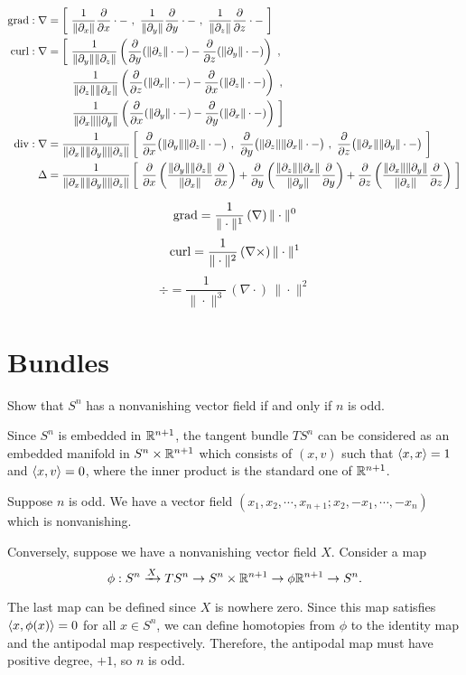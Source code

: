 \documentclass[a4paper]{article}
\begin{document}
\begin{align*}
\grad:\nabla&=\left[\ \frac1{\|\pd_x\|}\pd{x}\cdot-\ ,\ \frac1{\|\pd_y\|}\pd{y}\cdot-\ ,\ \frac1{\|\pd_z\|}\pd{z}\cdot-\ \right]\\
\curl:\nabla&=\left[\ \frac1{\|\pd_y\|\|\pd_z\|}\left(\pd{y}(\|\pd_z\|\cdot-)-\pd{z}(\|\pd_y\|\cdot-)\right)\ ,\right.\\
&\qquad\left.\frac1{\|\pd_z\|\|\pd_x\|}\left(\pd{z}(\|\pd_x\|\cdot-)-\pd{x}(\|\pd_z\|\cdot-)\right)\ ,\right.\\
&\qquad\left.\frac1{\|\pd_x\|\|\pd_y\|}\left(\pd{x}(\|\pd_y\|\cdot-)-\pd{y}(\|\pd_x\|\cdot-)\right)\ \right]\\
\div:\nabla&=\frac1{\|\pd_x\|\|\pd_y\|\|\pd_z\|}\left[\ \pd{x}\bigl(\|\pd_y\|\|\pd_z\|\cdot-\bigr)\ ,\ \pd{y}\bigl(\|\pd_z\|\|\pd_x\|\cdot-\bigr)\ ,\ \pd{z}\bigl(\|\pd_x\|\|\pd_y\|\cdot-\bigr)\ \right]\\
\Delta&=\frac1{\|\pd_x\|\|\pd_y\|\|\pd_z\|}\left[\ \pd{x}\left(\frac{\|\pd_y\|\|\pd_z\|}{\|\pd_x\|}\pd{x}\right)+\pd{y}\left(\frac{\|\pd_z\|\|\pd_x\|}{\|\pd_y\|}\pd{y}\right)+\pd{z}\left(\frac{\|\pd_x\|\|\pd_y\|}{\|\pd_z\|}\pd{z}\right)\ \right]
\end{align*}

\bigskip

\[\operatorname{grad}=\frac1{\|\cdot\|^1}\,(\nabla)\,\|\cdot\|^0\]
\[\operatorname{curl}=\frac1{\|\cdot\|^2}\,(\nabla\times)\,\|\cdot\|^1\]
\[\div=\frac1{\|\cdot\|^3}\,(\nabla\cdot)\,\|\cdot\|^2\]




\section{Bundles}
Show that $S^n$ has a nonvanishing vector field if and only if $n$ is odd.
\begin{sol}
Since $S^n$ is embedded in $\mathbb{R}^{n+1}$, the tangent bundle $TS^n$ can be considered as an embedded manifold in $S^n\times\mathbb{R}^{n+1}$ which consists of $(x,v)$ such that $\langle x,x\rangle=1$ and $\langle x,v\rangle=0$, where the inner product is the standard one of $\mathbb{R}^{n+1}$.

Suppose $n$ is odd.
We have a vector field
$(x_1,x_2,\cdots,x_{n+1};x_2,-x_1,\cdots,-x_n)$
which is nonvanishing.

Conversely, suppose we have a nonvanishing vector field $X$.
Consider a map
\[\phi:S^n\xrightarrow{X}TS^n\to S^n\times\mathbb{R}^{n+1}\to{\phi}\mathbb{R}^{n+1}\to S^n.\]

The last map can be defined since $X$ is nowhere zero. Since this map satisfies $\langle x,\phi(x)\rangle=0$ for all $x\in S^n$, we can define homotopies from $\phi$ to the identity map and the antipodal map respectively. Therefore, the antipodal map must have positive degree, $+1$, so $n$ is odd.
\end{sol}
\end{document}

